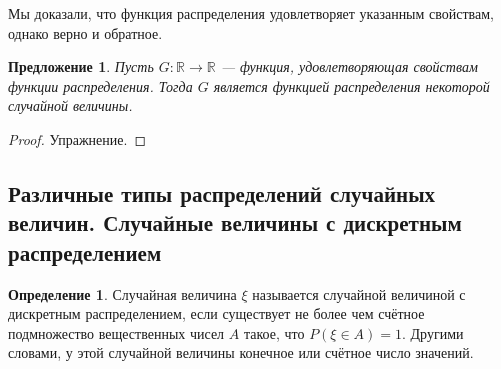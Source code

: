 \documentclass[11pt,openany,a4paper]{scrartcl}
\theoremstyle{plain}
\newtheorem{proposition}[theorem]{Предложение}
\theoremstyle{definition}
\newtheorem{definition}[theorem]{Определение}
\newcommand\mb{\mathbb}
\newcommand\real{\mb R}
\begin{document}
Мы доказали, что функция распределения удовлетворяет указанным свойствам, однако
верно и обратное.

\begin{proposition}
    Пусть $G: \real \to \real$ — функция, удовлетворяющая свойствам функции
    распределения. Тогда $G$ является функцией распределения некоторой случайной 
    величины.
\end{proposition}
\begin{proof}
    Упражнение.
\end{proof}

\subsection{Различные типы распределений случайных величин. Случайные величины
с дискретным распределением}

\begin{definition}
    Случайная величина $\xi$ называется случайной величиной с дискретным 
    распределением, если существует не более чем счётное подмножество
    вещественных чисел $A$ такое, что $P(\xi \in A) = 1$. Другими словами, у этой
    случайной величины конечное или счётное число значений.
\end{definition}
\end{document}
